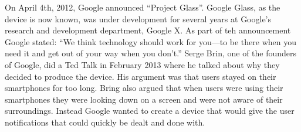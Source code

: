 








On April 4th, 2012, Google announced ``Project Glass''.\cite{GoogleGlassConcept} Google Glass, as the device is now known, was under development for several years at Google's research and development department, Google X. As part of teh announcement Google stated:  ``We think technology should work for you---to be there when you need it and get out of your way when you don’t.''\cite{GoogleGlassAnnouncement} Serge Brin, one of the founders of Google, did a Ted Talk in February 2013\cite{tedtalkWhyGlass} where he talked about why they decided to produce the device. His argument was that users stayed on their smartphones for too long. Bring also argued that when users were using their smartphones they were looking down on a screen and were not aware of their surroundings. Instead Google wanted to create a device that would give the user notifications that could quickly be dealt and done with.\\

